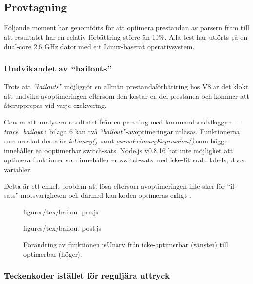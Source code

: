 \subsection{Provtagning}

Följande moment har genomförts för att optimera prestandan av parsern fram
till att resultatet har en relativ förbättring större än 10\%. Alla test har
utförts på en dual-core 2.6 GHz dator med ett Linux-baserat operativsystem.

\subsubsection{Undvikandet av ``bailouts''}

Trots att \textit{``bailouts''} möjliggör en allmän prestandaförbättring hos
V8 är det klokt att undvika avoptimeringen eftersom den kostar en del
prestanda och kommer att återupprepas vid varje exekvering.

Genom att analysera resultatet från en parsning med kommandoradsflaggan
\mbox{\textit{-{}-trace_bailout}} i bilaga 6 kan två
\textit{``bailout''}-avoptimeringar utläsas.  Funktionerna som orsakat dessa
är \textit{isUnary()} samt \textit{parsePrimaryExpression()} som bägge
innehåller en ooptimerbar switch-sats. \mbox{Node.js} v0.8.16 har inte
möjlighet att optimera funktioner som innehåller en switch-sats med
icke-litterala labels, d.v.s. variabler.

Detta är ett enkelt problem att lösa eftersom avoptimeringen inte sker för
``if-sats''-motsvarigheten och därmed kan koden optimeras enligt
.

\begin{figure}[ht]
  \begin{minipage}[t]{0.5\textwidth}
      {figures/tex/bailout-pre.js}
  \end{minipage}%
  \begin{minipage}[t]{0.5\textwidth}
      {figures/tex/bailout-post.js}
  \end{minipage}
  \caption{Förändring av funktionen isUnary från icke-optimerbar (vänster) till
    optimerbar (höger).}
  \label{fig:bailout}
\end{figure}

\subsubsection{Teckenkoder istället för reguljära uttryck}

